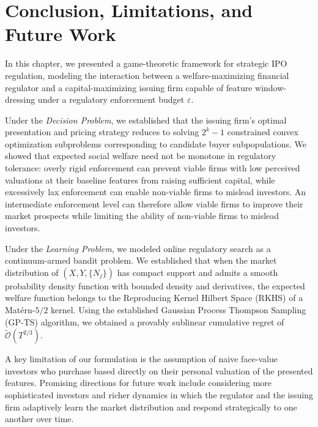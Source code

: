 \section{Conclusion, Limitations, and Future Work}
\label{sec:conclusion}



In this chapter, we presented a game-theoretic framework for strategic IPO regulation, modeling the interaction between a welfare-maximizing financial regulator and a capital-maximizing issuing firm capable of feature window-dressing under a regulatory enforcement budget $\varepsilon$.

Under the \emph{Decision Problem}, we established that the issuing firm's optimal presentation and pricing strategy reduces to solving $2^k-1$ constrained convex optimization subproblems corresponding to candidate buyer subpopulations. We showed that expected social welfare need not be monotone in regulatory tolerance: overly rigid enforcement can prevent viable firms with low perceived valuations at their baseline features from raising sufficient capital, while excessively lax enforcement can enable non-viable firms to mislead investors. An intermediate enforcement level can therefore allow viable firms to improve their market prospects while limiting the ability of non-viable firms to mislead investors.




Under the \emph{Learning Problem}, we modeled online regulatory search as a continuum-armed bandit problem. We established that when the market distribution of $(X,Y,\{N_j\})$ has compact support and admits a smooth probability density function with bounded density and derivatives, 
the expected welfare function belongs to the Reproducing Kernel Hilbert Space (RKHS) of a Matérn-$5/2$ kernel. Using the established Gaussian Process Thompson Sampling (GP-TS) algorithm, we obtained a provably sublinear cumulative regret of $\widetilde{\mathcal{O}}(T^{2/3})$.

A key limitation of our formulation is the assumption of naive face-value investors who purchase based directly on their personal valuation of the presented features. Promising directions for future work include considering more sophisticated investors and richer dynamics in which the regulator and the issuing firm adaptively learn the market distribution and respond strategically to one another over time.

